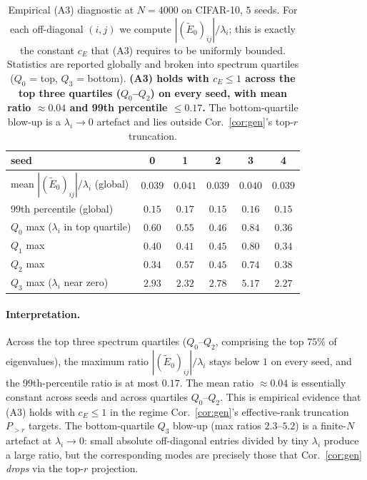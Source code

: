 \documentclass{article}
\newcommand{\E}{E}
\newcommand{\Etilde}{\widetilde{\E}}
\begin{document}
\begin{table}[!htbp]
\centering
\small
\caption{Empirical (A3) diagnostic at $N{=}4000$ on CIFAR-10, $5$ seeds.
For each off-diagonal $(i,j)$ we compute $|(\Etilde_0)_{ij}|/\lambda_i$;
this is exactly the constant $c_E$ that (A3) requires to be uniformly
bounded. Statistics are reported globally and broken into spectrum
quartiles ($Q_0$ = top, $Q_3$ = bottom). \textbf{(A3) holds with
$c_E \leq 1$ across the top three quartiles ($Q_0$--$Q_2$) on every
seed, with mean ratio $\approx 0.04$ and 99th percentile
$\leq 0.17$.} The bottom-quartile blow-up is a $\lambda_i \!\to\! 0$
artefact and lies outside Cor.~\ref{cor:gen}'s top-$r$ truncation.}
\label{tab:etilde}
\begin{tabular}{lccccc}
\toprule
seed & 0 & 1 & 2 & 3 & 4 \\
\midrule
mean $|(\Etilde_0)_{ij}|/\lambda_i$ (global) & $0.039$ & $0.041$ & $0.039$ & $0.040$ & $0.039$ \\
$99$th percentile (global)                   & $0.15$  & $0.17$  & $0.15$  & $0.16$  & $0.15$  \\
\midrule
$Q_0$ max ($\lambda_i$ in top quartile)      & $0.60$ & $0.55$ & $0.46$ & $0.84$ & $0.36$ \\
$Q_1$ max                                    & $0.40$ & $0.41$ & $0.45$ & $0.80$ & $0.34$ \\
$Q_2$ max                                    & $0.34$ & $0.57$ & $0.45$ & $0.74$ & $0.38$ \\
$Q_3$ max ($\lambda_i$ near zero)            & $2.93$ & $2.32$ & $2.78$ & $5.17$ & $2.27$ \\
\bottomrule
\end{tabular}
\end{table}

\paragraph{Interpretation.}
Across the top three spectrum quartiles ($Q_0$--$Q_2$, comprising the
top $75\%$ of eigenvalues), the maximum ratio
$|(\Etilde_0)_{ij}|/\lambda_i$ stays below $1$ on every seed, and the
99th-percentile ratio is at most $0.17$. The mean ratio
$\approx 0.04$ is essentially constant across seeds and across
quartiles $Q_0$--$Q_2$. This is empirical evidence that (A3) holds
with $c_E \leq 1$ in the regime Cor.~\ref{cor:gen}'s effective-rank
truncation $P_{>r}$ targets. The bottom-quartile $Q_3$ blow-up (max
ratios $2.3$--$5.2$) is a finite-$N$ artefact at $\lambda_i \to 0$:
small absolute off-diagonal entries divided by tiny $\lambda_i$
produce a large ratio, but the corresponding modes are precisely those
that Cor.~\ref{cor:gen} \emph{drops} via the top-$r$ projection.
\end{document}
